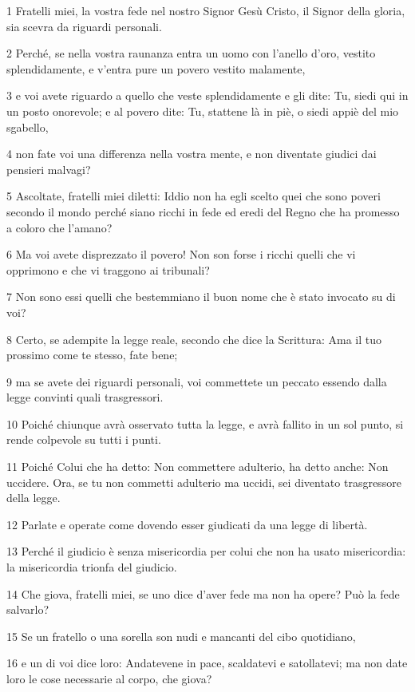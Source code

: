 \par 1 Fratelli miei, la vostra fede nel nostro Signor Gesù Cristo, il Signor della gloria, sia scevra da riguardi personali.
\par 2 Perché, se nella vostra raunanza entra un uomo con l'anello d'oro, vestito splendidamente, e v'entra pure un povero vestito malamente,
\par 3 e voi avete riguardo a quello che veste splendidamente e gli dite: Tu, siedi qui in un posto onorevole; e al povero dite: Tu, stattene là in piè, o siedi appiè del mio sgabello,
\par 4 non fate voi una differenza nella vostra mente, e non diventate giudici dai pensieri malvagi?
\par 5 Ascoltate, fratelli miei diletti: Iddio non ha egli scelto quei che sono poveri secondo il mondo perché siano ricchi in fede ed eredi del Regno che ha promesso a coloro che l'amano?
\par 6 Ma voi avete disprezzato il povero! Non son forse i ricchi quelli che vi opprimono e che vi traggono ai tribunali?
\par 7 Non sono essi quelli che bestemmiano il buon nome che è stato invocato su di voi?
\par 8 Certo, se adempite la legge reale, secondo che dice la Scrittura: Ama il tuo prossimo come te stesso, fate bene;
\par 9 ma se avete dei riguardi personali, voi commettete un peccato essendo dalla legge convinti quali trasgressori.
\par 10 Poiché chiunque avrà osservato tutta la legge, e avrà fallito in un sol punto, si rende colpevole su tutti i punti.
\par 11 Poiché Colui che ha detto: Non commettere adulterio, ha detto anche: Non uccidere. Ora, se tu non commetti adulterio ma uccidi, sei diventato trasgressore della legge.
\par 12 Parlate e operate come dovendo esser giudicati da una legge di libertà.
\par 13 Perché il giudicio è senza misericordia per colui che non ha usato misericordia: la misericordia trionfa del giudicio.
\par 14 Che giova, fratelli miei, se uno dice d'aver fede ma non ha opere? Può la fede salvarlo?
\par 15 Se un fratello o una sorella son nudi e mancanti del cibo quotidiano,
\par 16 e un di voi dice loro: Andatevene in pace, scaldatevi e satollatevi; ma non date loro le cose necessarie al corpo, che giova?
